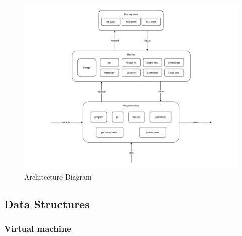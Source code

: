 \begin{figure}[h]
    \centering
    \caption{Architecture Diagram}
    \includegraphics[trim={1.80in 0 1.80in 0},width=\textwidth]{vm_architecture}
\end{figure}

\newpage

\subsection{Data Structures}

\subsubsection{Virtual machine}

